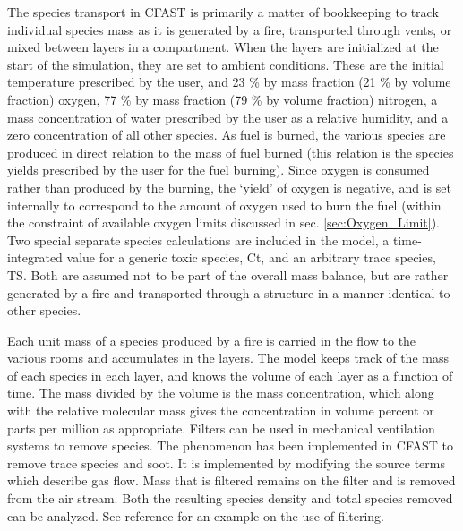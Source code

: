 The species transport in CFAST is primarily a matter of bookkeeping to track individual species mass as it is generated by a fire, transported through vents, or mixed between layers in a compartment.  When the layers are initialized at the start of the simulation, they are set to ambient conditions.  These are the initial temperature prescribed by the user, and 23 \% by mass fraction (21 \% by volume fraction) oxygen, 77 \% by mass fraction (79 \% by volume fraction) nitrogen, a mass concentration of water prescribed by the user as a relative humidity, and a zero concentration of all other species.  As fuel is burned, the various species are produced in direct relation to the mass of fuel burned (this relation is the species yields prescribed by the user for the fuel burning).  Since oxygen is consumed rather than produced by the burning, the `yield' of oxygen is negative, and is set internally to correspond to the amount of oxygen used to burn the fuel (within the constraint of available oxygen limits discussed in sec. \ref{sec:Oxygen_Limit}). Two special separate species calculations are included in the model, a time-integrated value for a generic toxic species, Ct, and an arbitrary trace species, TS.  Both are assumed not to be part of the overall mass balance, but are rather generated by a fire and transported through a structure in a manner identical to other species.

Each unit mass of a species produced by a fire is carried in the flow to the various rooms and accumulates in the layers.  The model keeps track of the mass of each species in each layer, and knows the volume of each layer as a function of time.  The mass divided by the volume is the mass concentration, which along with the relative molecular mass gives the concentration in volume percent or parts per million as appropriate. Filters can be used in mechanical ventilation systems to remove species. The phenomenon has been implemented in CFAST to remove trace species and soot. It is implemented by modifying the source terms which describe gas flow. Mass that is filtered remains on the filter and is removed from the air stream. Both the resulting species density and total species removed can be analyzed. See reference \cite{Jones:2008} for an example on the use of filtering.

